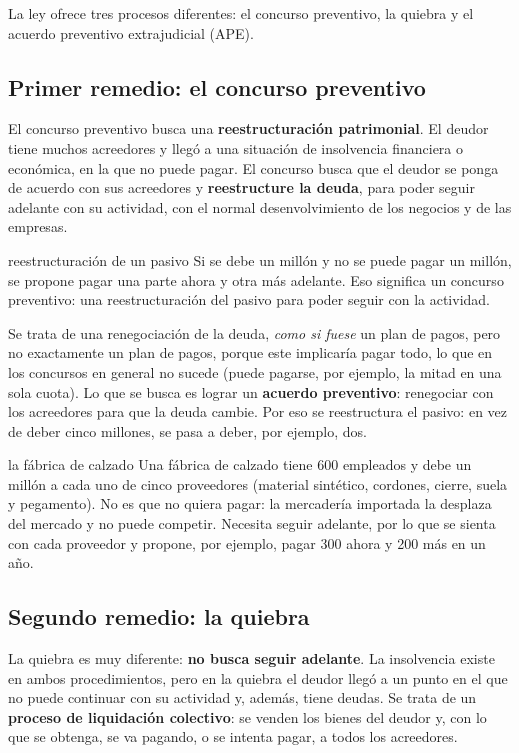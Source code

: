 \documentclass[12pt,oneside]{book}
\begin{document}
La ley ofrece tres procesos diferentes: el concurso preventivo, la quiebra y el acuerdo preventivo extrajudicial (APE).

\subsection{Primer remedio: el concurso preventivo}

El concurso preventivo busca una \textbf{reestructuración patrimonial}. El deudor tiene muchos acreedores y llegó a una situación de insolvencia financiera o económica, en la que no puede pagar. El concurso busca que el deudor se ponga de acuerdo con sus acreedores y \textbf{reestructure la deuda}, para poder seguir adelante con su actividad, con el normal desenvolvimiento de los negocios y de las empresas.

\begin{example}{reestructuración de un pasivo}
Si se debe un millón y no se puede pagar un millón, se propone pagar una parte ahora y otra más adelante. Eso significa un concurso preventivo: una reestructuración del pasivo para poder seguir con la actividad.
\end{example}

Se trata de una renegociación de la deuda, \emph{como si fuese} un plan de pagos, pero no exactamente un plan de pagos, porque este implicaría pagar todo, lo que en los concursos en general no sucede (puede pagarse, por ejemplo, la mitad en una sola cuota). Lo que se busca es lograr un \textbf{acuerdo preventivo}: renegociar con los acreedores para que la deuda cambie. Por eso se reestructura el pasivo: en vez de deber cinco millones, se pasa a deber, por ejemplo, dos.

\begin{example}{la fábrica de calzado}
Una fábrica de calzado tiene 600 empleados y debe un millón a cada uno de cinco proveedores (material sintético, cordones, cierre, suela y pegamento). No es que no quiera pagar: la mercadería importada la desplaza del mercado y no puede competir. Necesita seguir adelante, por lo que se sienta con cada proveedor y propone, por ejemplo, pagar 300 ahora y 200 más en un año.
\end{example}

\subsection{Segundo remedio: la quiebra}

La quiebra es muy diferente: \textbf{no busca seguir adelante}. La insolvencia existe en ambos procedimientos, pero en la quiebra el deudor llegó a un punto en el que no puede continuar con su actividad y, además, tiene deudas. Se trata de un \textbf{proceso de liquidación colectivo}: se venden los bienes del deudor y, con lo que se obtenga, se va pagando, o se intenta pagar, a todos los acreedores.
\end{document}

